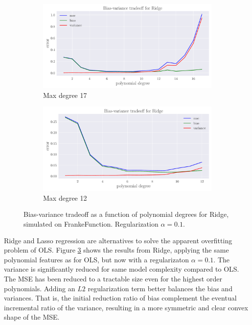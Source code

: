 \documentclass[a4paper]{article}
\begin{document}
	\begin{figure}[h]
		
		\centering
		\begin{subfigure}{0.49\textwidth}
			\centering
			\includegraphics[width=\textwidth]{../output_extra/plots/bias_var_Ridge_c17.pdf}
			\caption{Max degree 17}
			\label{fig:Ridge_a}
		\end{subfigure}
		\hfill
		\begin{subfigure}{0.49\textwidth}
			\centering
			\includegraphics[width=\textwidth]{../output_extra/plots/bias_var_Ridge_c12.pdf}
			\caption{Max degree 12}
			\label{fig:Ridge_b}
		\end{subfigure}
		\caption{Bias-variance tradeoff as a function of polynomial degrees for Ridge, simulated on FrankeFunction. Regularization $\alpha=0.1$.}
		\label{fig:Ridge}
	\end{figure}
	
	Ridge and Lasso regression are alternatives to solve the apparent overfitting problem of OLS. Figure \ref{fig:Ridge} shows the results from Ridge, applying the same polynomial features as for OLS, but now with a regularizaton $\alpha=0.1$. The variance is significantly reduced for same model complexity compared to OLS. The MSE has been reduced to a tractable size even for the highest order polynomials. 
	Adding an $L2$ regularization term better balances the bias and variances. That is, the initial reduction ratio of bias complement the eventual incremental ratio of the variance, resulting in a more symmetric and clear convex  shape of the MSE. \\
	
\end{document}
